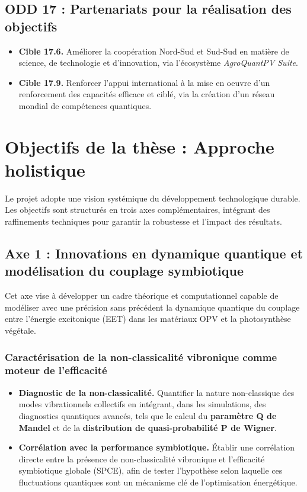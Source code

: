 \documentclass[12pt, a4paper]{article}
\begin{document}
\subsection{ODD 17 : Partenariats pour la réalisation des objectifs}
\begin{itemize}
    \item \textbf{Cible 17.6.} Améliorer la coopération Nord-Sud et Sud-Sud en matière de science, de technologie et d’innovation, via l'écosystème \textit{AgroQuantPV Suite}.

    \item \textbf{Cible 17.9.} Renforcer l'appui international à la mise en oeuvre d'un renforcement des capacités efficace et ciblé, via la création d'un réseau mondial de compétences quantiques.
\end{itemize}


\section{Objectifs de la thèse : Approche holistique}

Le projet adopte une vision systémique du développement technologique durable. Les objectifs sont structurés en trois axes complémentaires, intégrant des raffinements techniques pour garantir la robustesse et l'impact des résultats.

\subsection{Axe 1 : Innovations en dynamique quantique et modélisation du couplage symbiotique}

Cet axe vise à développer un cadre théorique et computationnel capable de modéliser avec une précision sans précédent la dynamique quantique du couplage entre l'énergie excitonique (EET) dans les matériaux OPV et la photosynthèse végétale.

\subsubsection{Caractérisation de la non-classicalité vibronique comme moteur de l'efficacité}
\begin{itemize}
    \item \textbf{Diagnostic de la non-classicalité.} Quantifier la nature non-classique des modes vibrationnels collectifs en intégrant, dans les simulations, des diagnostics quantiques avancés, tels que le calcul du \textbf{paramètre Q de Mandel} et de la \textbf{distribution de quasi-probabilité P de Wigner}.

    \item \textbf{Corrélation avec la performance symbiotique.} Établir une corrélation directe entre la présence de non-classicalité vibronique et l'efficacité symbiotique globale (SPCE), afin de tester l'hypothèse selon laquelle ces fluctuations quantiques sont un mécanisme clé de l'optimisation énergétique.
\end{itemize}
\end{document}
